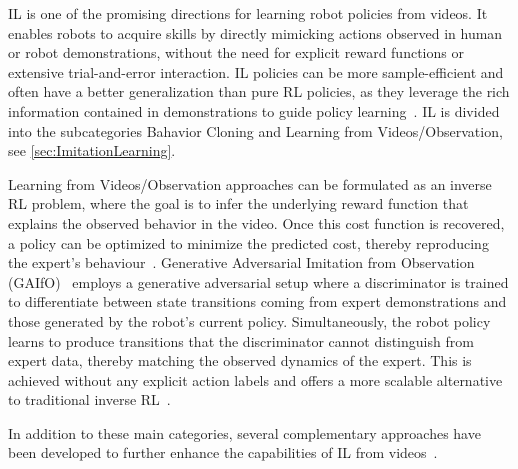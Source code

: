 \ac{IL} is one of the promising directions for learning robot policies from videos. It enables robots to acquire skills by directly mimicking actions observed in human or robot demonstrations, without the need for explicit reward functions or extensive trial-and-error interaction. \ac{IL} policies can be more sample-efficient and often have a better generalization than pure \ac{RL} policies, as they leverage the rich information contained in demonstrations to guide policy learning~\cite{Eze2024LearningBW}. 
\ac{IL} is divided into the subcategories Bahavior Cloning and Learning from Videos/Observation, see \autoref{sec:ImitationLearning}.


Learning from Videos/Observation approaches can be formulated as an inverse \ac{RL} problem, where the goal is to infer the underlying reward function that explains the observed behavior in the video. Once this cost function is recovered, a policy can be optimized to minimize the predicted cost, thereby reproducing the expert's behaviour~\cite{Eze2024LearningBW, Torabi2018GenerativeAI}.
Generative Adversarial Imitation from Observation (GAIfO)~\cite{Torabi2018GenerativeAI} employs a generative adversarial setup where a discriminator is trained to differentiate between state transitions coming from expert demonstrations and those generated by the robot's current policy. Simultaneously, the robot policy learns to produce transitions that the discriminator cannot distinguish from expert data, thereby matching the observed dynamics of the expert. 
This is achieved without any explicit action labels and offers a more scalable alternative to traditional inverse \ac{RL}~\cite{Eze2024LearningBW}.


In addition to these main categories, several complementary approaches have been developed to further enhance the capabilities of \ac{IL} from videos~\cite{Eze2024LearningBW}.

